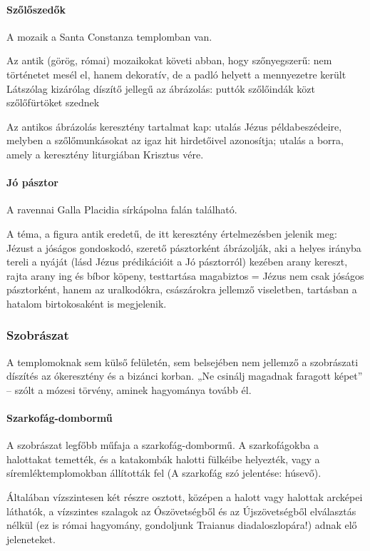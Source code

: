 	\paragraph{Szőlőszedők}
	A mozaik a Santa Constanza templomban van.
	
	Az antik (görög, római) mozaikokat követi abban, hogy szőnyegszerű: nem történetet mesél el, hanem dekoratív, de a padló helyett a mennyezetre került
	Látszólag kizárólag díszítő jellegű az ábrázolás: puttók szőlőindák közt szőlőfürtöket szednek
	
	Az antikos ábrázolás keresztény tartalmat kap: utalás Jézus példabeszédeire, melyben a szőlőmunkásokat az igaz hit hirdetőivel azonosítja; utalás a borra, amely a keresztény liturgiában Krisztus vére.
	
	\paragraph{Jó pásztor}
	A ravennai Galla Placidia sírkápolna falán található.
	
	A téma, a figura antik eredetű, de itt keresztény értelmezésben jelenik meg: Jézust a jóságos gondoskodó, szerető pásztorként ábrázolják, aki a helyes irányba tereli a nyáját (lásd Jézus prédikációit a Jó pásztorról)
	kezében arany kereszt, rajta arany ing és bíbor köpeny, testtartása magabiztos = Jézus nem csak jóságos pásztorként, hanem az uralkodókra, császárokra jellemző viseletben, tartásban a hatalom birtokosaként is megjelenik.
	
\subsubsection{Szobrászat}

A templomoknak sem külső felületén, sem belsejében nem jellemző a szobrászati díszítés az ókeresztény és a bizánci korban. „Ne csinálj magadnak faragott képet” – szólt a mózesi törvény, aminek hagyománya tovább él.

\paragraph{Szarkofág-dombormű}
A szobrászat legfőbb műfaja a szarkofág-dombormű. 
A szarkofágokba a halottakat temették, és a katakombák halotti fülkéibe helyezték, vagy a síremléktemplomokban állították fel (A szarkofág szó jelentése: húsevő).

Általában vízszintesen két részre osztott, középen a halott vagy halottak arcképei láthatók, a vízszintes szalagok az Ószövetségből és az Újszövetségből elválasztás nélkül (ez is római hagyomány, gondoljunk Traianus diadaloszlopára!) adnak elő jeleneteket.

